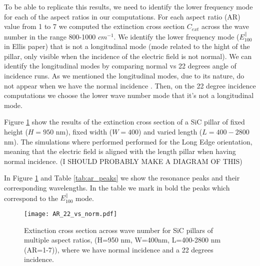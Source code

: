 To be able to replicate this results, we need to identify the lower frequency mode for each of
the aspect ratios in our computations. For each aspect ratio (AR) 
value from 1 to 7 we computed the extinction cross section $C_{ext}$ across the wave number in the range
800-1000 $cm^{-1}$. We identify the lower frequency mode ($E^{\parallel}_{100}$ in Ellis paper)  that is not a 
longitudinal mode (mode related to the hight of the pillar, only visible when the incidence of the 
electric field is not normal). We can identify the longitudinal modes by comparing normal vs 22 degrees 
angle of incidence runs. As we mentioned the longitudinal modes, due to its nature, do not appear when we 
have the normal incidence . Then, on the 22 degree incidence computations we choose the lower wave number mode
that it's not a longitudinal mode. 

Figure \ref{fig:AR_22_vs_norm} show the results of the extinction cross section of a SiC pillar of fixed
height ($H=950$ nm), fixed width ($W=400$) and varied length ($L=400-2800$ nm). The simulations where performed 
performed for the Long Edge orientation, meaning that the electric field is aligned with the length pillar 
when having normal incidence. (I SHOULD PROBABLY MAKE A DIAGRAM OF THIS)

In Figure \ref{fig:AR_22_vs_norm} and Table \ref{tab:ar_peaks} we show the resonance peaks and
their corresponding wavelengths. In the table we mark in bold the peaks which correspond to 
the $E^{\parallel}_{100}$ mode. 

\begin{figure}
    \centering
    \texttt{[image: AR\_22\_vs\_norm.pdf]} 
    \caption{Extinction cross section across wave number for SiC pillars of multiple aspect ratios,  
             (H=950 nm, W=400nm, L=400-2800 nm (AR=1-7)), where we have normal incidence and a 
             22 degrees incidence.
            }
    \label{fig:AR_22_vs_norm}
 \end{figure}


